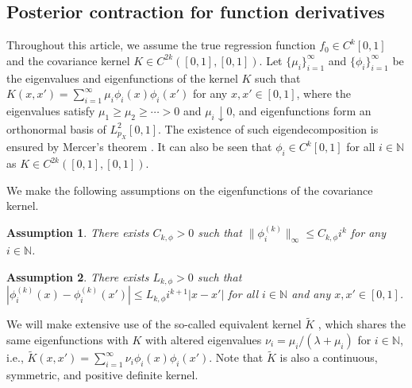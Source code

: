 \documentclass[12pt]{article}
\newcommand{\s}{\sum_{i=1}^{\infty}}
\theoremstyle{plain}
\newtheorem{assumption}{Assumption}
\renewcommand{\theassumption}{A}
\theoremstyle{nonitalicremark}
\begin{document}
\subsection{Posterior contraction for function derivatives}

Throughout this article, we assume the true regression function $f_0 \in C^k[0,1]$ and the covariance kernel $K\in C^{2k}([0,1],[0,1])$. Let $\{\mu_i\}_{i=1}^\infty$ and $\{\phi_i\}_{i=1}^\infty$ be the eigenvalues and eigenfunctions of the kernel $K$ such that $K(x,x')=\sum_{i=1}^{\infty}\mu_i\phi_i(x)\phi_i(x')$ for any $x,x'\in [0,1]$, where the eigenvalues satisfy $\mu_1\geq\mu_2\geq \cdots> 0$ and $\mu_i \downarrow 0$, and eigenfunctions form an orthonormal basis  of $L_{p_X}^2[0,1]$. The existence of such eigendecomposition is ensured by Mercer's theorem \cite[Theorem~4.2]{rasmussen2006}. It can also be seen that $\phi_i\in C^{k}[0,1]$ for all $i\in\mathbb{N}$ as $K\in C^{2k}([0,1],[0,1])$.

We make the following assumptions on the eigenfunctions of the covariance kernel.

\renewcommand{\theassumption}{(A)}


\begin{assumption}
There exists $C_{k,\phi}>0$ such that $\|\phi^{(k)}_i\|_\infty \leq C_{k,\phi} i^k$ for any $i\in\mathbb{N}$.
\end{assumption}

\renewcommand{\theassumption}{(B)}

\begin{assumption}
There exists $L_{k,\phi}>0$ such that $|\phi^{(k)}_i(x)-\phi^{(k)}_i(x')| \leq L_{k,\phi} i^{k+1} |x-x'|$ for all $i\in\mathbb{N}$ and any $x,x'\in[0,1]$.
\end{assumption}

We will make extensive use of the so-called equivalent kernel $\tilde{K}$ \cite[Chapter~7]{rasmussen2006}, which shares the same eigenfunctions with $K$ with altered eigenvalues $\nu_i={\mu_i}/{(\lambda+\mu_i)}$ for $i\in\mathbb{N}$, i.e., $\tilde{K}(x,x')=\s \nu_i\phi_i(x)\phi_i(x')$. Note that $\tilde{K}$ is also a continuous, symmetric, and positive definite kernel.
\end{document}
